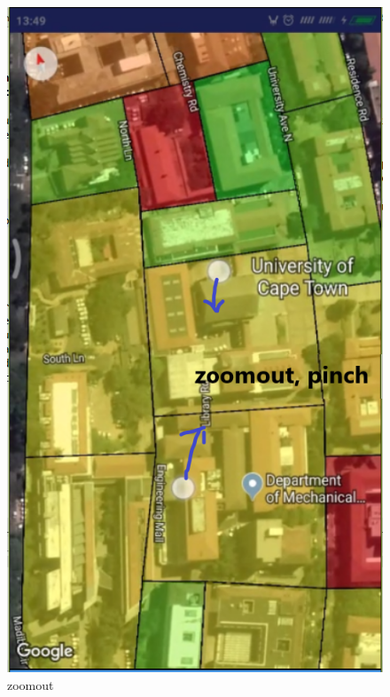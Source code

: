 \begin{figure}
	\centering
	\includegraphics[width=0.7\linewidth]{images_manual/zoomout}
	\caption{zoomout}
	\label{fig:zoomout}
\end{figure}


